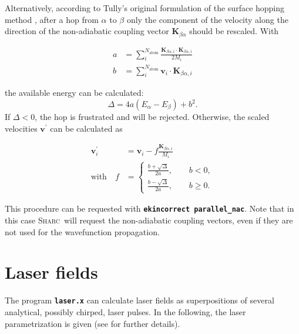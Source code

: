 \documentclass[a4paper,11pt,DIV=15,openany,twoside=false]{scrbook}
\newcommand{\tthdump}[1]{#1}
\newcommand{\sharc}{\textsc{Sharc}}
\newcommand{\ttt}[1]{\textbf{\texttt{#1}}}
\newcommand{\VEC}[1]{\ensuremath{\mathbf{#1}}}
\begin{document}
Alternatively, according to Tully's original formulation of the surface hopping method \cite{Tully1990JCP}, after a hop from $\alpha$ to $\beta$ only the component of the velocity along the direction of the non-adiabatic coupling vector $\VEC{K}_{\beta\alpha}$ should be rescaled. With
\tthdump{
  \begin{align}
    a&=\sum\limits_i^{N_\mathrm{atom}} \frac{\VEC{K}_{\beta\alpha, i}\cdot\VEC{K}_{\beta\alpha, i}}{2M_i}\\
    b&=\sum\limits_i^{N_\mathrm{atom}} \VEC{v}_{i}\cdot\VEC{K}_{\beta\alpha, i}
  \end{align}
}
the available energy can be calculated:
\begin{equation}
  \Delta=
  4a
  \left(
    E_\alpha-E_\beta
  \right)+b^2.
\end{equation}
If $\Delta<0$, the hop is frustrated and will be rejected. Otherwise, the scaled velocities $\VEC{v}^\prime$ can be calculated as
\tthdump{
  \begin{align}
    \VEC{v}_i^\prime&=\VEC{v}_i-f\frac{\VEC{K}_{\beta\alpha, i}}{M_i}\\
    \mathrm{with}\quad f&=
    \begin{cases}
      \frac{b+\sqrt{\Delta}}{2a},\qquad b<0,\\
      \frac{b-\sqrt{\Delta}}{2a},\qquad b\geq 0.
    \end{cases}
  \end{align}
}
This procedure can be requested with \ttt{ekincorrect parallel\_nac}. Note that in this case \sharc\ will request the non-adiabatic coupling vectors, even if they are not used for the wavefunction propagation.


\section{Laser fields}\label{met:laser_field}

The program \ttt{laser.x} can calculate laser fields as superpositions of several analytical, possibly chirped, laser pulses. In the following, the laser parametrization is given (see \cite{Marquetand2007} for further details).
\end{document}
